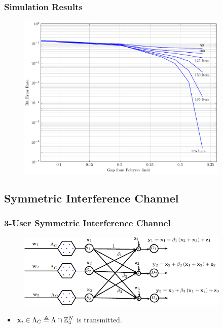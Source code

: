 \documentclass[10pt,presentation]{beamer}
\begin{document}
\begin{frame}\frametitle{Simulation Results}
\begin{figure}
\begin{center}
\includegraphics[width=0.9\textwidth]{BER_iters_4_72_9.pdf}
\end{center}
\end{figure}
\end{frame}

\subsection{Symmetric Interference Channel}
\begin{frame}\frametitle{3-User Symmetric Interference Channel}
	\begin{figure}
	\centering
    \includegraphics[width=4in]{IC_model_ISIT_3user.pdf}
	\end{figure}
\pause
\begin{itemize}
\item $\mathbf{x}_{i}\in \Lambda_{C}\triangleq \Lambda \cap \mathbb{Z}_{4}^{N}$ is transmitted.
\vspace{0.2in}
\end{itemize}
\end{frame}
\end{document}
